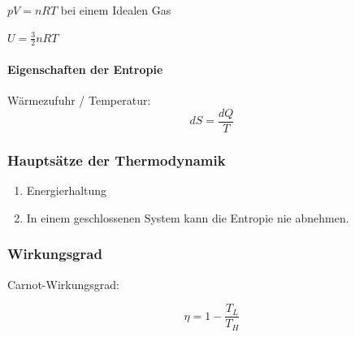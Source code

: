 \documentclass[a4paper]{scrartcl}
\begin{document}
$pV = nRT$ bei einem Idealen Gas

$U = \frac{3}{2} nRT$


\paragraph{Eigenschaften der Entropie}

Wärmezufuhr / Temperatur:
\[
	dS = \frac{dQ}{T}
\]

\subsubsection{Hauptsätze der Thermodynamik}

\begin{enumerate}
	\item Energierhaltung
	\item In einem geschlossenen System kann die Entropie nie abnehmen.
\end{enumerate}


\subsubsection{Wirkungsgrad}

Carnot-Wirkungsgrad:

\[
	\eta = 1 - \frac{T_L}{T_H}
\]
\end{document}
